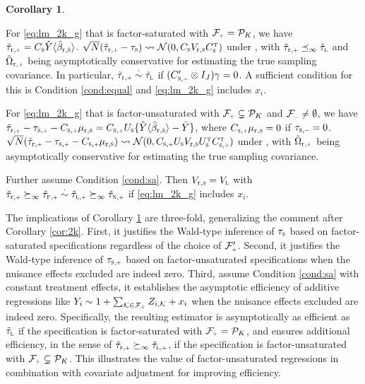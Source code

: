 \documentclass[11pt]{article}
\theoremstyle{definition}
\newtheorem{corollary}{Corollary}
\begin{document}
\begin{corollary}\label{cor:2k_g}
\begine[(i)]
\item For \eqref{eq:lm_2k_g} that is factor-saturated with $\mfp = \pk$, we have 
\begini
\itemc $\ttrp   =  \cs\hybrs $. 
\itemc $\sqrt N(\ttrp - \ts ) \rs \mn(0, \cs \vrrs \cs^\T)$ under \creasym,  with $\ttrp \preci \ttl$ and $\torp$  being asymptotically conservative for estimating the true sampling covariance. 
%
In particular, $\ttrp \asim \ttl$ if $(\csm' \otimes I_J) \gamma = 0$. A sufficient condition for this is Condition \ref{cond:equal} and \eqref{eq:lm_2k_g} includes $x_i$.
\endi 
\item For \eqref{eq:lm_2k_g} that is factor-unsaturated with  $\mfp  \subsetneq \pk$ and $\mfm  \neq \emptyset$, we have 
\begini
\itemc
$
\ttrp  - \tsp -\csp\murs = \csp\us\{\hybrs  - \by\}$, where $ \csp \murs = 0$ if $\tsm = 0$. 
\itemc $\sqrt N(\ttrp  - \tsp - \csp \murs) \rs \mathcal N(0, \csp \us  \vrrs  \us^\T \csp^\T)$  under \creasym, with $\torp$ being asymptotically conservative for estimating the true sampling covariance.

Further assume Condition \ref{cond:sa}. Then $V_{\textup{r},{\textsc{s}}} = V_{\textsc{l}}$ with $
\ttrp  \succi \ttfp  \asim \ttlp \succi \ttnp$
if \eqref{eq:lm_2k_g} includes $x_i$. 
\endi
\ende 
\end{corollary}

The implications of Corollary \ref{cor:2k_g} are three-fold, generalizing the comment after Corollary \ref{cor:2k}. 
First, it justifies the Wald-type inference of $\tau_{\textsc{s}}$ based on factor-saturated specifications regardless of the choice of $\mfp'$.
Second, it justifies the Wald-type inference of $\tsp$ based on factor-unsaturated specifications when the nuisance effects excluded are indeed zero. 
Third, assume Condition \ref{cond:sa} with constant treatment effects, it establishes the asymptotic efficiency of additive regressions like $Y_i \sim 1+\sum_{\mk \in \mfp} \zimk + x_i$ when the nuisance effects excluded are indeed zero.
Specifically, the resulting estimator is asymptotically as efficient as $\tilde\tau_{\textsc{l}}$ if the specification is factor-saturated with $\mfp = \pk$, and ensures additional efficiency, in the sense of $\ttrp \succi \ttlp$, if the specification is factor-unsaturated with $\mfp \subsetneq \pk$. 
 This illustrates the value of factor-unsaturated regressions in combination with covariate adjustment for improving efficiency. 
\end{document}

